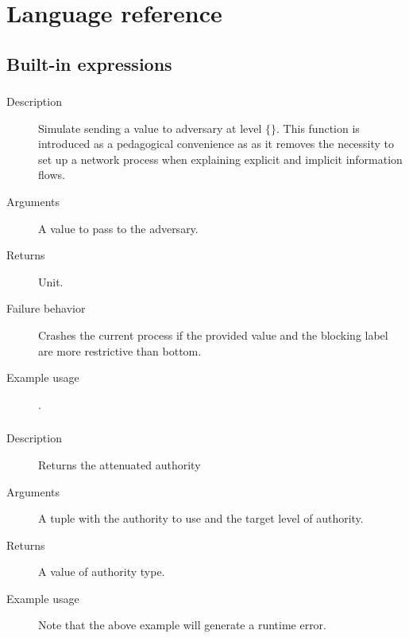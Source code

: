 \section{Language reference}

\subsection{Built-in expressions}


\subsubsection{}
\begin{description}
    \item [Description] Simulate sending a value to adversary at level $\{\}$. This function is introduced as a
    pedagogical convenience as as it removes the necessity to set up a network process when explaining explicit and implicit information flows.
    \item [Arguments] A value to pass to the adversary.
    \item [Returns] Unit.
    \item [Failure behavior] Crashes the current process if the provided value and the blocking label are more restrictive than bottom.
    \item [Example usage] .
\end{description}


\subsubsection{}
\begin{description}
    \item [Description] Returns the attenuated authority
    \item [Arguments] A tuple with the authority to use and the target level of authority.
    \item [Returns] A value of authority type.
    \item [Example usage]  Note that the above example will generate a runtime error.
\end{description}


\subsubsection{}

